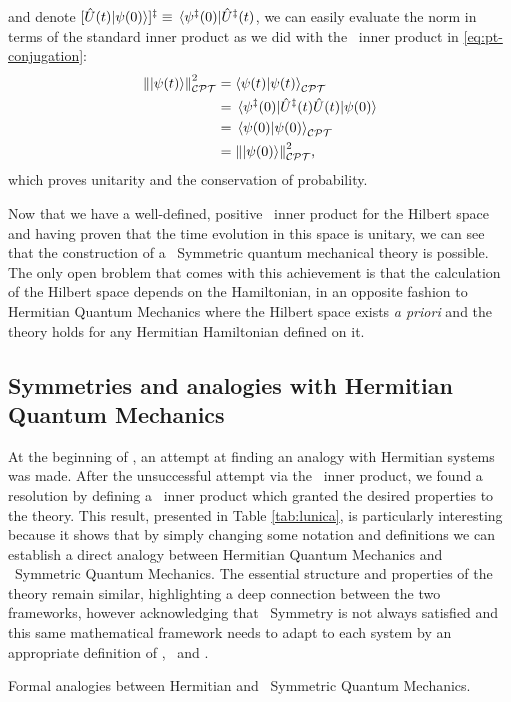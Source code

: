             and denote $\bqty*{\hU\pqty{t}\!\ket{\psi\pqty{0}}}\!^\myconj \equiv \bra*{\psi^\myconj\pqty{0}}\!\hU^\myconj\pqty{t}$, we can easily evaluate the norm in terms of the standard inner product as we did with the \PT\ inner product in \eqref{eq:pt-conjugation}:
            \begin{align*}
                \norm{\ket{\psi\pqty{t}}}^2_{\CPT}
                &= \braket{\psi{\pqty{t}}}{\psi\pqty{t}}_{\CPT} \\
                &= \bra*{\psi^\myconj\pqty{0}}\! \hU^\myconj\pqty{t} \hU\pqty{t} \!\ket{\psi\pqty{0}} \\
                &= \bra*{\psi\pqty{0}}\ket{\psi\pqty{0}}_{\CPT} \\
                &= \norm{\ket{\psi\pqty{0}}}^2_{\CPT}
                \mycomma
            \end{align*}
            which proves unitarity and the conservation of probability.

            Now that we have a well-defined, positive \CPT\ inner product for the Hilbert space and having proven that the time evolution in this space is unitary, we can see that the construction of a \PT\ Symmetric quantum mechanical theory is possible. The only open broblem that comes with this achievement is that the calculation of the Hilbert space depends on the Hamiltonian, in an opposite fashion to Hermitian Quantum Mechanics where the Hilbert space exists \emph{a priori} and the theory holds for any Hermitian Hamiltonian defined on it.

        \subsection{Symmetries and analogies with Hermitian Quantum Mechanics}
        At the beginning of , an attempt at finding an analogy with Hermitian systems was made. After the unsuccessful attempt via the \PT\ inner product, we found a resolution by defining a \CPT\ inner product which granted the desired properties to the theory. This result, presented in Table \ref{tab:lunica}, is particularly interesting because it shows that by simply changing some notation and definitions we can establish a direct analogy between Hermitian Quantum Mechanics and \PT\ Symmetric Quantum Mechanics. The essential structure and properties of the theory remain similar, highlighting a deep connection between the two frameworks, however acknowledging that \PT\ Symmetry is not always satisfied and this same mathematical framework needs to adapt to each system by an appropriate definition of \hC, \hP\ and \hT.
        \begin{table}
            \centering
            \label{tab:lunica}
            
            \caption{Formal analogies between Hermitian and \PT\ Symmetric Quantum Mechanics.}
        \end{table}